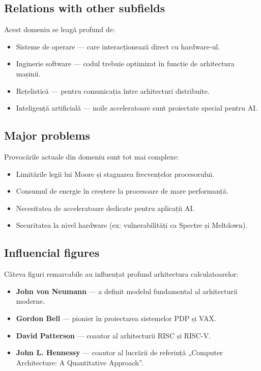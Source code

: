 \documentclass[12pt, letterpaper]{article}
\begin{document}
\subsection*{Relations with other subfields}
Acest domeniu se leagă profund de:
\begin{itemize}
    \item Sisteme de operare — care interacționează direct cu hardware-ul.
    \item Inginerie software — codul trebuie optimizat în funcție de arhitectura mașinii.
    \item Rețelistică — pentru comunicația între arhitecturi distribuite.
    \item Inteligență artificială — noile acceleratoare sunt proiectate special pentru AI.
\end{itemize}

\subsection*{Major problems}
Provocările actuale din domeniu sunt tot mai complexe:
\begin{itemize}
    \item Limitările legii lui Moore și stagnarea frecvențelor procesorului.
    \item Consumul de energie în creștere la procesoare de mare performanță.
    \item Necesitatea de acceleratoare dedicate pentru aplicații AI.
    \item Securitatea la nivel hardware (ex: vulnerabilități ca Spectre și Meltdown).
\end{itemize}

\subsection*{Influencial figures}
Câteva figuri remarcabile au influențat profund arhitectura calculatoarelor:
\begin{itemize}
    \item \textbf{John von Neumann} — a definit modelul fundamental al arhitecturii moderne.
    \item \textbf{Gordon Bell} — pionier în proiectarea sistemelor PDP și VAX.
    \item \textbf{David Patterson} — coautor al arhitecturii RISC și RISC-V.
    \item \textbf{John L. Hennessy} — coautor al lucrării de referință „Computer Architecture: A Quantitative Approach”.
\end{itemize}
\end{document}
